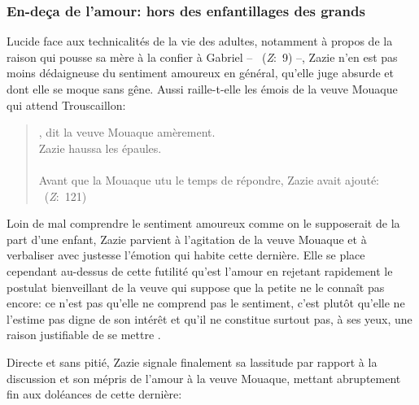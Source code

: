 \subsubsection{En-deça de l'amour: hors des enfantillages des grands}
Lucide face aux technicalités de la vie des adultes, notamment à propos de la raison qui pousse sa mère à la confier à Gabriel -- ~(\textit{Z}:~9) --, Zazie n'en est pas moins dédaigneuse du sentiment amoureux en général, qu'elle juge absurde et dont elle se moque sans gêne.
Aussi raille-t-elle les émois de la veuve Mouaque qui attend Trouscaillon:
\begin{quote}
  \begin{singlespace}
    \small
    , dit la veuve Mouaque amèrement. \\
    Zazie haussa les épaules. \\
     \\
    Avant que la Mouaque utu le temps de répondre, Zazie avait ajouté: \\
    ~(\textit{Z}:~121)
    \normalsize
  \end{singlespace}
\end{quote}
Loin de mal comprendre le sentiment amoureux comme on le supposerait de la part d'une enfant, Zazie parvient à  l'agitation de la veuve Mouaque et à verbaliser avec justesse l'émotion qui habite cette dernière.
Elle se place cependant au-dessus de cette futilité qu'est l'amour en rejetant rapidement le postulat bienveillant de la veuve qui suppose que la petite ne le connaît pas encore: ce n'est pas qu'elle ne comprend pas le sentiment, c'est plutôt qu'elle ne l'estime pas digne de son intérêt et qu'il ne constitue surtout pas, à ses yeux, une raison justifiable de se mettre .
\par
Directe et sans pitié, Zazie signale finalement sa lassitude par rapport à la discussion et son mépris de l'amour à la veuve Mouaque, mettant abruptement fin aux doléances de cette dernière:
